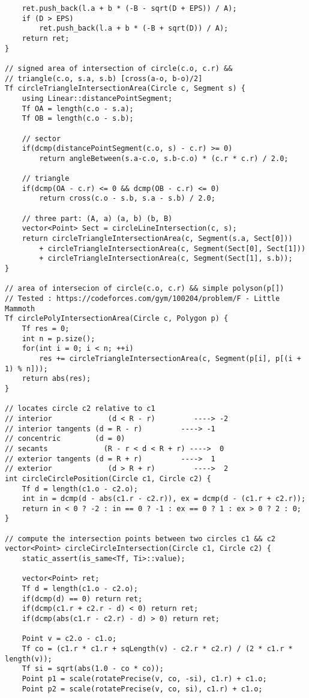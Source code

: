 \documentclass[FSZ,a4paper,onesided]{article}
\begin{document}
\begin{multicols*}{\COLS}
\begin{lstlisting}
    ret.push_back(l.a + b * (-B - sqrt(D + EPS)) / A);
    if (D > EPS)
        ret.push_back(l.a + b * (-B + sqrt(D)) / A);
    return ret;
}

// signed area of intersection of circle(c.o, c.r) &&
// triangle(c.o, s.a, s.b) [cross(a-o, b-o)/2]
Tf circleTriangleIntersectionArea(Circle c, Segment s) {
    using Linear::distancePointSegment;
    Tf OA = length(c.o - s.a);
    Tf OB = length(c.o - s.b);

    // sector
    if(dcmp(distancePointSegment(c.o, s) - c.r) >= 0)
        return angleBetween(s.a-c.o, s.b-c.o) * (c.r * c.r) / 2.0;

    // triangle
    if(dcmp(OA - c.r) <= 0 && dcmp(OB - c.r) <= 0)
        return cross(c.o - s.b, s.a - s.b) / 2.0;

    // three part: (A, a) (a, b) (b, B)
    vector<Point> Sect = circleLineIntersection(c, s);
    return circleTriangleIntersectionArea(c, Segment(s.a, Sect[0]))
        + circleTriangleIntersectionArea(c, Segment(Sect[0], Sect[1]))
        + circleTriangleIntersectionArea(c, Segment(Sect[1], s.b));
}

// area of intersecion of circle(c.o, c.r) && simple polyson(p[])
// Tested : https://codeforces.com/gym/100204/problem/F - Little Mammoth
Tf circlePolyIntersectionArea(Circle c, Polygon p) {
    Tf res = 0;
    int n = p.size();
    for(int i = 0; i < n; ++i)
        res += circleTriangleIntersectionArea(c, Segment(p[i], p[(i + 1) % n]));
    return abs(res);
}

// locates circle c2 relative to c1
// interior             (d < R - r)         ----> -2
// interior tangents (d = R - r)         ----> -1
// concentric        (d = 0)
// secants             (R - r < d < R + r) ---->  0
// exterior tangents (d = R + r)         ---->  1
// exterior             (d > R + r)         ---->  2
int circleCirclePosition(Circle c1, Circle c2) {
    Tf d = length(c1.o - c2.o);
    int in = dcmp(d - abs(c1.r - c2.r)), ex = dcmp(d - (c1.r + c2.r));
    return in < 0 ? -2 : in == 0 ? -1 : ex == 0 ? 1 : ex > 0 ? 2 : 0;
}

// compute the intersection points between two circles c1 && c2
vector<Point> circleCircleIntersection(Circle c1, Circle c2) {
    static_assert(is_same<Tf, Ti>::value);

    vector<Point> ret;
    Tf d = length(c1.o - c2.o);
    if(dcmp(d) == 0) return ret;
    if(dcmp(c1.r + c2.r - d) < 0) return ret;
    if(dcmp(abs(c1.r - c2.r) - d) > 0) return ret;

    Point v = c2.o - c1.o;
    Tf co = (c1.r * c1.r + sqLength(v) - c2.r * c2.r) / (2 * c1.r * length(v));
    Tf si = sqrt(abs(1.0 - co * co));
    Point p1 = scale(rotatePrecise(v, co, -si), c1.r) + c1.o;
    Point p2 = scale(rotatePrecise(v, co, si), c1.r) + c1.o;


\end{lstlisting}
\end{multicols*}
\end{document}
